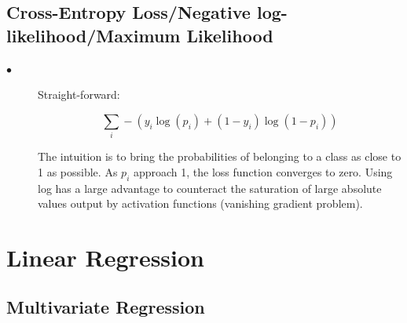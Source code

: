 \documentclass{article}
\begin{document}
\subsection{Cross-Entropy Loss/Negative log-likelihood/Maximum Likelihood}
\begin{description}

  \item[$\bullet$] Straight-forward:
  
  \[\sum_i -(y_i\log(p_i) + (1-y_i)\log(1-p_i))\]
  
  The intuition is to bring the probabilities of belonging to a class as close to 1 as possible. As $p_i$ approach 1, the loss function converges to zero. Using log has a large advantage to counteract the saturation of large absolute values output by activation functions (vanishing gradient problem).
  

\end{description}


\section{Linear Regression}
\subsection{Multivariate Regression}
\end{document}
